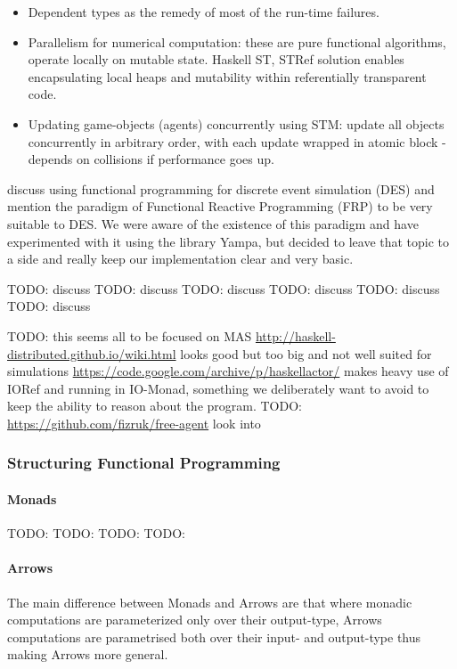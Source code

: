 \begin{itemize}
\item Dependent types as the remedy of most of the run-time failures.
\item Parallelism for numerical computation: these are pure functional algorithms, operate locally on mutable state. Haskell ST, STRef solution enables encapsulating local heaps and mutability within referentially transparent code.
\item Updating game-objects (agents) concurrently using STM: update all objects concurrently in arbitrary order, with each update wrapped in atomic block - depends on collisions if performance goes up.
\end{itemize}

\cite{jankovic_functional_2007} discuss using functional programming for discrete event simulation (DES) and mention the paradigm of Functional Reactive Programming (FRP) to be very suitable to DES. We were aware of the existence of this paradigm and have experimented with it using the library Yampa, but decided to leave that topic to a side and really keep our implementation clear and very basic.

TODO: discuss \cite{schneider_towards_2012}
TODO: discuss \cite{vendrov_frabjous:_2014}
TODO: discuss \cite{sulzmann_specifying_2007}
TODO: discuss \cite{jankovic_functional_2007}
TODO: discuss \cite{de_jong_suitability_2014}
TODO: discuss \cite{sorokin_aivika_2015}

TODO: this seems all to be focused on MAS
\url{http://haskell-distributed.github.io/wiki.html} looks good but too big and not well suited for simulations
\url{https://code.google.com/archive/p/haskellactor/} makes heavy use of IORef and running in IO-Monad, something we deliberately want to avoid to keep the ability to reason about the program.
TODO: \url{https://github.com/fizruk/free-agent} look into

\subsubsection{Structuring Functional Programming}
\paragraph{Monads}
TODO: \cite{moggi_computational_1989}
TODO: \cite{wadler_comprehending_1990}
TODO: \cite{wadler_monads_1995}
TODO: \cite{wadler_how_1997}

\paragraph{Arrows}
The main difference between Monads and Arrows are that where monadic computations are parameterized only over their output-type, Arrows computations are parametrised both over their input- and output-type thus making Arrows more general.

